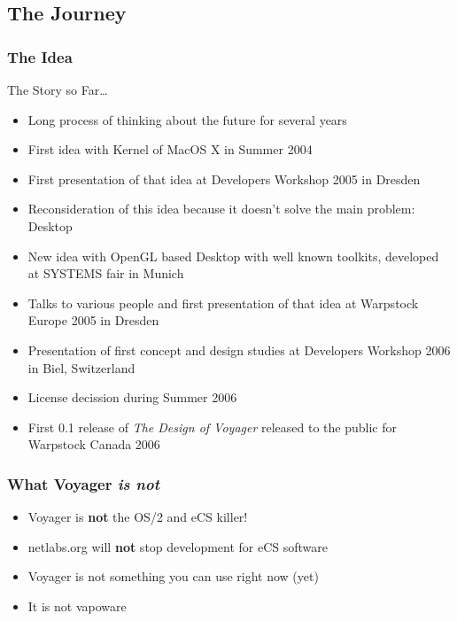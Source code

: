 \documentclass{beamer}
\begin{document}
\subsection{The Journey}
\begin{frame}[allowframebreaks=0.6]
\frametitle{The Idea}
The Story so Far\ldots
\begin{itemize}
  \item Long process of thinking about the future for several years
  \item First idea with Kernel of MacOS X in Summer 2004
  \item First presentation of that idea at Developers Workshop 2005 in Dresden
  \item Reconsideration of this idea because it doesn't solve the main problem: Desktop
  \item New idea with OpenGL based Desktop with well known toolkits, developed at SYSTEMS fair in Munich
  \item Talks to various people and first presentation of that idea at
  Warpstock Europe 2005 in Dresden
  \item Presentation of first concept and design studies at Developers
  Workshop 2006 in Biel, Switzerland
  \item License decission during Summer 2006
  \item First 0.1 release of \textit{The Design of Voyager} released to the
  public for Warpstock Canada 2006
\end{itemize}
\end{frame}

\begin{frame}
\frametitle{What Voyager \textit{is not}}
\begin{itemize}
  \item Voyager is \textbf{not} the OS/2 and eCS killer!
  \item netlabs.org will \textbf{not} stop development for eCS software
  \item Voyager is not something you can use right now (yet)
  \item It is not vapoware
\end{itemize}
\end{frame}
\end{document}
